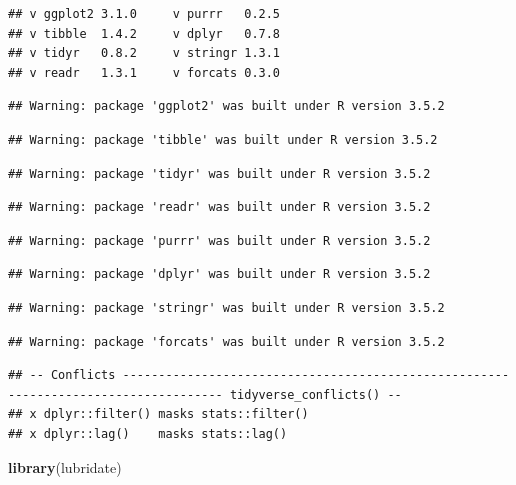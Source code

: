 \documentclass[12pt,]{article}
\newenvironment{Shaded}{\begin{snugshade}}{\end{snugshade}}
\newcommand{\KeywordTok}[1]{\textcolor[rgb]{0.13,0.29,0.53}{\textbf{#1}}}
\newcommand{\NormalTok}[1]{#1}
\begin{document}
\begin{verbatim}
## v ggplot2 3.1.0     v purrr   0.2.5
## v tibble  1.4.2     v dplyr   0.7.8
## v tidyr   0.8.2     v stringr 1.3.1
## v readr   1.3.1     v forcats 0.3.0
\end{verbatim}

\begin{verbatim}
## Warning: package 'ggplot2' was built under R version 3.5.2
\end{verbatim}

\begin{verbatim}
## Warning: package 'tibble' was built under R version 3.5.2
\end{verbatim}

\begin{verbatim}
## Warning: package 'tidyr' was built under R version 3.5.2
\end{verbatim}

\begin{verbatim}
## Warning: package 'readr' was built under R version 3.5.2
\end{verbatim}

\begin{verbatim}
## Warning: package 'purrr' was built under R version 3.5.2
\end{verbatim}

\begin{verbatim}
## Warning: package 'dplyr' was built under R version 3.5.2
\end{verbatim}

\begin{verbatim}
## Warning: package 'stringr' was built under R version 3.5.2
\end{verbatim}

\begin{verbatim}
## Warning: package 'forcats' was built under R version 3.5.2
\end{verbatim}

\begin{verbatim}
## -- Conflicts ------------------------------------------------------------------------------------ tidyverse_conflicts() --
## x dplyr::filter() masks stats::filter()
## x dplyr::lag()    masks stats::lag()
\end{verbatim}

\begin{Shaded}
\begin{Highlighting}[]
\KeywordTok{library}\NormalTok{(lubridate)}
\end{Highlighting}
\end{Shaded}
\end{document}
